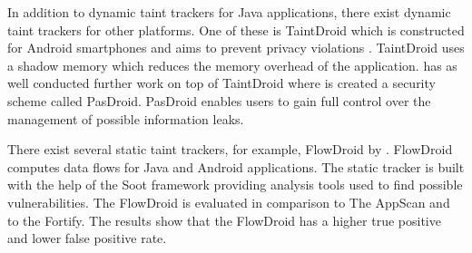 In addition to dynamic taint trackers for Java applications, there exist dynamic taint trackers for other platforms. One of these is TaintDroid which is constructed for Android smartphones and aims to prevent privacy violations \parencite{EnckWilliam2014Taif}. TaintDroid uses a shadow memory which reduces the memory overhead of the application. \textcite{HsiaoS.W.2014PRse} has as well conducted further work on top of TaintDroid where is created a security scheme called PasDroid. PasDroid enables users to gain full control over the management of possible information leaks.

There exist several static taint trackers, for example, FlowDroid by \textcite{ArztS.2014FPcf}. FlowDroid computes data flows for Java and Android applications. The static tracker is built with the help of the Soot framework \parencite{soot} providing analysis tools used to find possible vulnerabilities. The FlowDroid is evaluated in comparison to The AppScan and to the Fortify. The results show that the FlowDroid has a higher true positive and lower false positive rate.